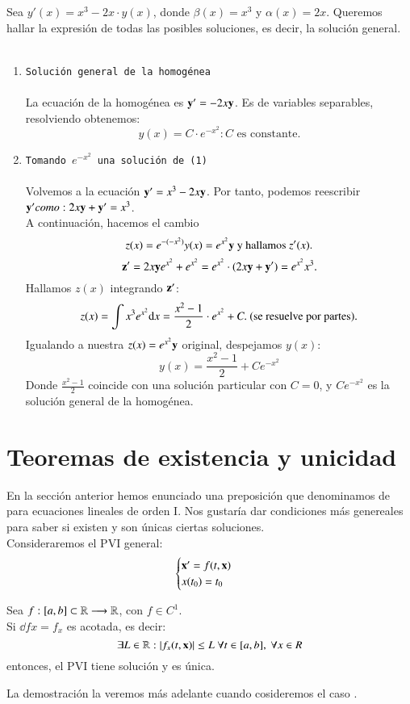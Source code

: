 \begin{eg}
    Sea $y'(x) = x^3 - 2x\cdot y(x)$, donde $\beta(x) = x^3$ y $\alpha(x) = 2x$. Queremos hallar la expresión de todas las posibles soluciones, es decir, la solución general.\\\\
    \begin{enumerate}
        \item \texttt{Solución general de la homogénea}\\\\
        La ecuación de la homogénea es $\mathbf{y}'=-2x\mathbf{y}$. Es de variables separables, resolviendo obtenemos:
        $$
            y(x) = C \cdot e^{-x^2} : C \text{ es constante.}
        $$
        \item \texttt{Tomando $e^{-x^2}$ una solución de (1)}\\\\
        Volvemos a la ecuación $\mathbf{y}' = x^3-2x\mathbf{y}$. Por tanto, podemos reescribir $\mathbf{y}' como: 2x\mathbf{y} + \mathbf{y}' = x^3$.\\
        A continuación, hacemos el cambio
        $$
            z(x) = e^{-(-x^2)} y(x) = e^{x^2} \mathbf{y} \text{ y hallamos $z'(x)$.}
        $$
        $$
            \mathbf{z}' = 2x\mathbf{y}e^{x^2} + e^{x^2} = e^{x^2}\cdot (2x\mathbf{y}+\mathbf{y}') = e^{x^2} x^3.
        $$
        Hallamos $z(x)$ integrando $\mathbf{z}'$:
        $$
            z(x) = \int x^3 e^{x^2} \mathrm{d} x = \frac{x^2-1}{2} \cdot e^{x^2} + C.\text{ (se resuelve por partes).}
        $$
        Igualando a nuestra $z(x) = e^{x^2} \mathbf{y}$ original, despejamos $y(x)$:
        $$
            y(x) = \frac{x^2-1}{2} + C e^{-x^2}
        $$
        Donde $\frac{x^2-1}{2}$ coincide con una solución particular con $C = 0$, y $C e^{-x^2}$ es la solución general de la homogénea.
    \end{enumerate}
\end{eg}
\section{Teoremas de existencia y unicidad}
En la sección anterior hemos enunciado una preposición que denominamos de  para ecuaciones lineales de orden I. Nos gustaría dar condiciones más genereales para saber si existen y son únicas ciertas soluciones.\\
Consideraremos el PVI general:
$$
    \begin{cases}
        \mathbf{x'} = f(t, \mathbf{x}) \\ x(t_0) = t_0
    \end{cases}
$$
\begin{thm}
    Sea $f: [a,b] \subset \mathbb{R} \longrightarrow \mathbb{R}$, con $f \in C^1$.\\Si $\dd{f}{x} = f_x$ es acotada,  es decir:
    $$
        \exists L \in \mathbb{R} : |f_x(t, \mathbf{x})| \leq L\ \forall t\in[a,b],\ \forall x\in R
    $$ entonces, el PVI tiene solución y es única.
\end{thm}
La demostración la veremos más adelante cuando cosideremos el caso .

